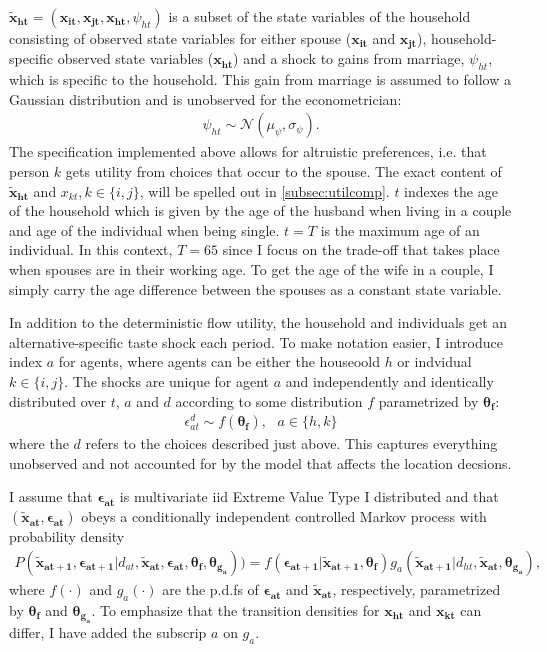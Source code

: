 $\boldsymbol{\tilde{x}_{ht}}=(\boldsymbol{x_{it}},\boldsymbol{x_{jt}},\boldsymbol{x_{ht}},\psi_{ht})$ is a subset of the state variables of the household consisting of observed state variables for either spouse ($\boldsymbol{x_{it}}$ and $\boldsymbol{x_{jt}}$), household-specific observed state variables ($\boldsymbol{x_{ht}}$) and a shock to gains from marriage, $\psi_{ht}$, which is specific to the household. This gain from marriage is assumed to follow a Gaussian distribution and is unobserved for the econometrician:
\begin{align*}
\psi_{ht} \sim \mathcal{N}(\mu_{\psi},\sigma_{\psi}).
\end{align*}
The specification implemented above allows for altruistic preferences, i.e. that person $k$ gets utility from choices that occur to the spouse. The exact content of $\boldsymbol{\tilde{x}_{ht}}$ and $x_{kt},k\in\{i,j\}$, will be spelled out in \autoref{subsec:utilcomp}. $t$ indexes the age of the household which is given by the age of the husband when living in a couple and age of the individual when being single. $t=T$ is the maximum age of an individual. In this context, $T=65$ since I focus on the trade-off that takes place when spouses are in their working age. To get the age of the wife in a couple, I simply carry the age difference between the spouses as a constant state variable. 

In addition to the deterministic flow utility, the household and individuals get an alternative-specific taste shock each period. To make notation easier, I introduce index $a$ for agents, where agents can be either the houseoold $h$ or indvidual $k\in\{i,j\}$. The shocks are unique for agent $a$ and independently and identically distributed over $t$, $a$ and $d$ according to some distribution $f$ parametrized by $\boldsymbol{\theta_f}$:
\begin{align}
\epsilon_{at}^d \sim f(\boldsymbol{\theta_f}),\text{ }a\in\{h,k\}
\label{eq:shock}
\end{align}
where the $d$ refers to the choices described just above. This captures everything unobserved and not accounted for by the model that affects the location decsions.

I assume that $\boldsymbol{\epsilon_{at}}$ is multivariate iid Extreme Value Type I distributed and that $(\boldsymbol{\tilde{x}_{at}},\boldsymbol{\epsilon_{at}})$ obeys a conditionally independent controlled Markov process with probability density
\begin{align}
P(\boldsymbol{\tilde{x}_{at+1}},\boldsymbol{\epsilon_{at+1}}|d_{at},\boldsymbol{\tilde{x}_{at}},\boldsymbol{\epsilon_{at}},\boldsymbol{\theta_f},\boldsymbol{\theta_{g_a}}))=f(\boldsymbol{\epsilon_{at+1}}|\boldsymbol{\tilde{x}_{at+1}},\boldsymbol{\theta_f})g_a(\boldsymbol{\tilde{x}_{at+1}}|d_{ht},\boldsymbol{\tilde{x}_{at}},\boldsymbol{\theta_{g_a}}),
\label{eq:condi}
\end{align}
where $f(\cdot)$ and $g_a(\cdot)$ are the p.d.fs of $\boldsymbol{\epsilon_{at}}$ and $\boldsymbol{\tilde{x}_{at}}$, respectively, parametrized by $\boldsymbol{\theta_f}$ and $\boldsymbol{\theta_{g_a}}$. To emphasize that the transition densities for $\boldsymbol{x_{ht}}$ and $\boldsymbol{x_{kt}}$ can differ, I have added the subscrip $a$ on $g_a$. 

